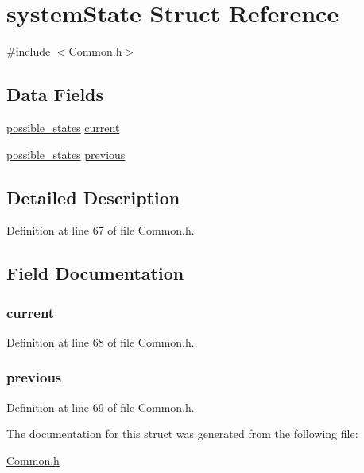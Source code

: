\hypertarget{structsystem_state}{\section{system\+State Struct Reference}
\label{structsystem_state}
}


{\ttfamily \#include $<$Common.\+h$>$}

\subsection*{Data Fields}
\begin{DoxyCompactItemize}
\item 
\hyperlink{_common_8h_a05931287b056487cf89495f39026fbe1}{possible\+\_\+states} \hyperlink{structsystem_state_a18284a4a782e71c070e1d2e80734509d}{current}
\item 
\hyperlink{_common_8h_a05931287b056487cf89495f39026fbe1}{possible\+\_\+states} \hyperlink{structsystem_state_af2f2716b4afa23c8b53a9351a0924b6b}{previous}
\end{DoxyCompactItemize}


\subsection{Detailed Description}


Definition at line 67 of file Common.\+h.



\subsection{Field Documentation}
\hypertarget{structsystem_state_a18284a4a782e71c070e1d2e80734509d}{
\subsubsection[{current}]{ current}}\label{structsystem_state_a18284a4a782e71c070e1d2e80734509d}


Definition at line 68 of file Common.\+h.

\hypertarget{structsystem_state_af2f2716b4afa23c8b53a9351a0924b6b}{
\subsubsection[{previous}]{ previous}}\label{structsystem_state_af2f2716b4afa23c8b53a9351a0924b6b}


Definition at line 69 of file Common.\+h.



The documentation for this struct was generated from the following file\+:\begin{DoxyCompactItemize}
\item 
\hyperlink{_common_8h}{Common.\+h}\end{DoxyCompactItemize}
